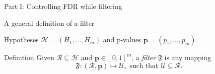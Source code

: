 \documentclass{beamer}
\begin{document}
%

\begin{frame}

\centering

\color{beamer@blendedblue}


\LARGE
Part I: Controlling FDR while filtering

\end{frame}



\begin{frame}{A general definition of a filter}
	
	Hypotheses $\mathcal H = (H_1, \dots, H_m)$ and p-values $\bm p = (p_1, \dots, p_m)$.
	\vspace{0.1in}
	
	\begin{block}{Definition}
		Given $\mathcal R \subseteq \mathcal H$ and $\bm p \in [0,1]^m$, a \textit{filter} $\mathfrak F$ is any mapping
		\begin{equation*}
		\mathfrak F: (\mathcal R, \bm p) \mapsto \mathcal U, \text{ such that } \mathcal U \subseteq \mathcal R.
		\end{equation*}
	\end{block}
	
	\vspace{0.1in}


\end{frame}
\end{document}
